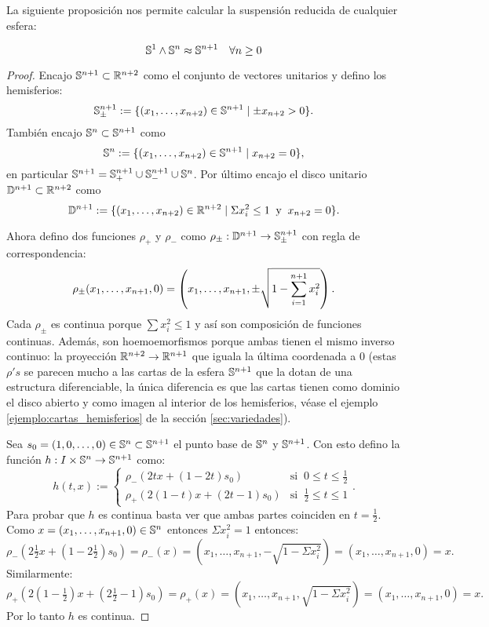 \documentclass[../../topologia_algebraica]{subfiles}
\begin{document}
La siguiente proposici\'on nos permite calcular la suspensi\'on reducida de cualquier esfera:

\begin{prop}\label{prop:smash_esferas}
  \[
    \mathbb{S}^1\wedge\mathbb{S}^n \approx \mathbb{S}^{n+1} \quad\forall n\geq 0
  \]
\end{prop}

\begin{proof}
  Encajo $\mathbb{S}^{n+1}\subset\mathbb{R}^{n+2}$ como el conjunto de vectores unitarios y defino los hemisferios:
  \[
    \mathbb{S}^{n+1}_{\pm}:=\{(x_1,\ldots,x_{n+2})\in\mathbb{S}^{n+1}\mid \pm x_{n+2}>0\}.
  \]
  Tambi\'en encajo $\mathbb{S}^n\subset\mathbb{S}^{n+1}$ como
  \[
    \mathbb{S}^n:=\{(x_1,\ldots,x_{n+2})\in\mathbb{S}^{n+1}\mid x_{n+2}=0\},
  \]
  en particular $\mathbb{S}^{n+1}=\mathbb{S}^{n+1}_{+}\cup\mathbb{S}^{n+1}_-\cup\mathbb{S}^n$. Por \'ultimo encajo el disco
  unitario $\mathbb{D}^{n+1}\subset\mathbb{R}^{n+2}$ como
  \[
    \mathbb{D}^{n+1}:=
    \{(x_1,\ldots,x_{n+2})\in\mathbb{R}^{n+2}\mid \Sigma x_i^2\leq 1 \;\;\text{y}\;\; x_{n+2}=0\}.
  \]

  Ahora defino dos funciones $\rho_+$ y $\rho_-$ como $\rho_{\pm}:\mathbb{D}^{n+1}\rightarrow\mathbb{S}^{n+1}_{\pm}$
  con regla de correspondencia:
  \[
    \rho_{\pm}(x_1,\ldots,x_{n+1},0)=\left( x_1,\ldots,x_{n+1},\pm\sqrt{1-\sum_{i=1}^{n+1}x_i^2} \right).
  \]
  Cada $\rho_{\pm}$ es continua porque $\sum x_i^2\leq 1$ y as\'i son composici\'on de funciones
  continuas. Adem\'as, son hoemoemorfismos porque ambas tienen el mismo inverso continuo: la
  proyecci\'on $\mathbb{R}^{n+2}\rightarrow\mathbb{R}^{n+1}$ que iguala la \'ultima coordenada a 0 (estas $\rho's$ se parecen
  mucho a las cartas de la esfera $\mathbb{S}^{n+1}$ que la dotan de una estructura diferenciable, la
  \'unica diferencia es que las cartas tienen como dominio el disco abierto y como imagen al
  interior de los hemisferios, v\'ease el ejemplo \ref{ejemplo:cartas_hemisferios} de la secci\'on
  \ref{sec:variedades}).

  Sea $s_0=(1,0,\ldots,0)\in\mathbb{S}^n\subset\mathbb{S}^{n+1}$ el punto base de $\mathbb{S}^n$ y $\mathbb{S}^{n+1}$. Con esto
  defino la funci\'on $h:I\times\mathbb{S}^n\rightarrow\mathbb{S}^{n+1}$ como:
  \[
    h(t,x):=
    \begin{cases}
      \rho_-(2tx+(1-2t)s_0) &\text{si}\;\; 0\leq t\leq\frac{1}{2}\\
      \rho_+(2(1-t)x+(2t-1)s_0) &\text{si}\;\; \frac{1}{2}\leq t\leq 1
    \end{cases}.
  \]
  Para probar que $h$ es continua basta ver que ambas partes coinciden en $t=\frac{1}{2}$. Como
  $x=(x_1,\ldots,x_{n+1},0)\in\mathbb{S}^n$ entonces $\Sigma x_i^2=1$ entonces:
  \[
    \rho_-(2\tfrac{1}{2}x+(1-2\tfrac{1}{2})s_0)=
    \rho_-(x)=
    (x_1,\ldots,x_{n+1},-\sqrt{1-\Sigma x_i^2})=
    (x_1,\ldots,x_{n+1},0)=x.
  \]
  Similarmente:
  \[
    \rho_+(2(1-\tfrac{1}{2})x+(2\tfrac{1}{2}-1)s_0)=
    \rho_+(x)=
    (x_1,\ldots,x_{n+1},\sqrt{1-\Sigma x_i^2})=
    (x_1,\ldots,x_{n+1},0)=x.
  \]
  Por lo tanto $h$ es continua.


\end{proof}
\end{document}
